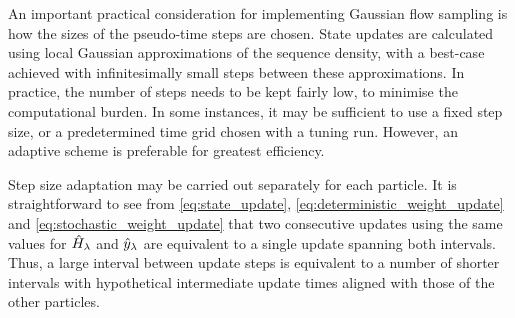 \documentclass{article}
\begin{document}
An important practical consideration for implementing Gaussian flow sampling is how the sizes of the pseudo-time steps are chosen. State updates are calculated using local Gaussian approximations of the sequence density, with a best-case achieved with infinitesimally small steps between these approximations. In practice, the number of steps needs to be kept fairly low, to minimise the computational burden. In some instances, it may be sufficient to use a fixed step size, or a predetermined time grid chosen with a tuning run. However, an adaptive scheme is preferable for greatest efficiency.

Step size adaptation may be carried out separately for each particle. It is straightforward to see from \eqref{eq:state_update}, \eqref{eq:deterministic_weight_update} and \eqref{eq:stochastic_weight_update} that two consecutive updates using the same values for $\hat{H}_{\lambda}$ and $\hat{y}_{\lambda}$ are equivalent to a single update spanning both intervals. Thus, a large interval between update steps is equivalent to a number of shorter intervals with hypothetical intermediate update times aligned with those of the other particles.
\end{document}
